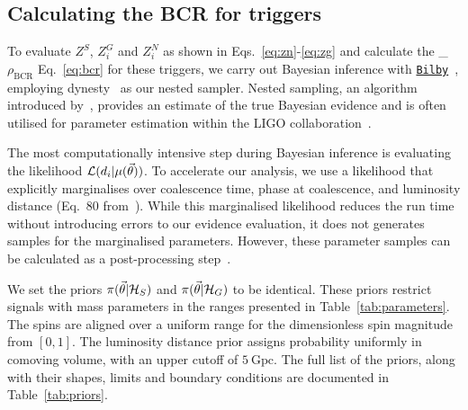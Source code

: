 \documentclass[%
 nofootinbib,
 amsmath,amssymb,
 aps,
 twocolumn
]{revtex4-2}
\newcommand{\bilby}{{\sc \href{https://lscsoft.docs.ligo.org/bilby/}{\texttt{Bilby}}}\xspace}
\newcommand{\dynesty}{{\sc dynesty}\xspace}
\newcommand{\mathcmd}[1]{{\sc \relax\ifmmode#1\else $#1$\fi}\xspace}
\newcommand{\bcr}{\mathcmd{\rho_\text{BCR}}}
\newcommand{\parameters}{\mathcmd{\vec{\theta}}}
\newcommand{\template}{\mathcmd{\mu(\parameters)}}
\begin{document}
\subsection{Calculating the BCR for triggers}
To evaluate $Z^S$, $Z^G_i$ and $Z^N_i$ as shown in Eqs.~\ref{eq:zn}-\ref{eq:zg} and calculate the \bcr Eq.~\ref{eq:bcr} for these triggers, we carry out Bayesian inference with \bilby~\cite{bilby}, employing \dynesty~\cite{dynesty} as our nested sampler. Nested sampling, an algorithm introduced by~\citet{skilling2004, skilling2006}, provides an estimate of the true Bayesian evidence and is often utilised for parameter estimation within the LIGO collaboration~\cite{bilby, bilby_paper, pbilby_paper}.

The most computationally intensive step during Bayesian inference is evaluating the likelihood $\mathcal{L}(d_i|\template)$. To accelerate our analysis, we use a likelihood that explicitly marginalises over coalescence time, phase at coalescence, and luminosity distance (Eq.~80 from~\citet{intro_to_gw_bayes}). While this marginalised likelihood reduces the run time without introducing errors to our evidence evaluation, it does not generates samples for the marginalised parameters. However, these parameter samples can be calculated as a post-processing step~\cite{intro_to_gw_bayes}.

We set the priors $\pi(\parameters|\mathcal{H}_S)$ and $\pi(\parameters|\mathcal{H}_G)$ to be identical. These priors restrict signals with mass parameters in the ranges presented in Table~\ref{tab:parameters}. The spins are aligned over a uniform range for the dimensionless spin magnitude from $\left[0,1\right]$. The luminosity distance prior assigns probability uniformly in comoving volume, with an upper cutoff of $5\ \text{Gpc}$. The full list of the priors, along with their shapes, limits and boundary conditions are documented in Table~\ref{tab:priors}. 
\end{document}
